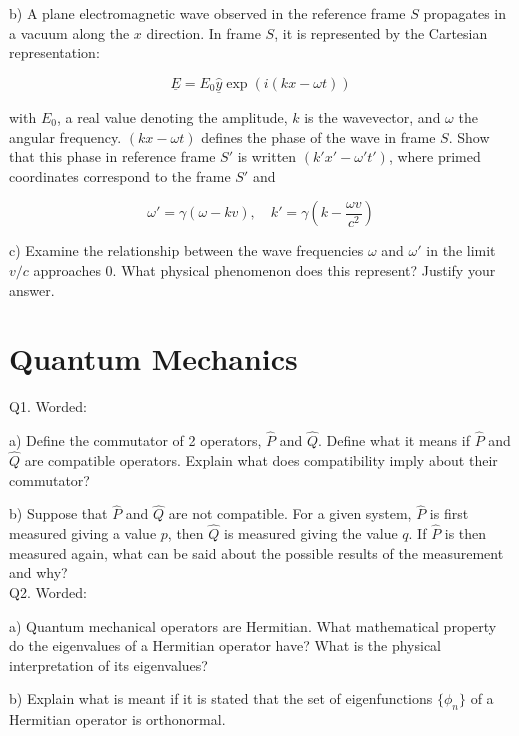 \documentclass[a4paper,11pt]{article}
\begin{document}
\medskip

b) A plane electromagnetic wave observed in the reference frame \( S \) propagates in a vacuum along the \( x \) direction. In frame \( S \), it is represented by the Cartesian representation: 

\[ \underline{E} = E_{0} \hat{\underline{y}} \exp(i(kx - \omega t)) \]

with \( E_{0} \), a real value denoting the amplitude, \( k \) is the wavevector, and \( \omega \) the angular frequency. \( (kx - \omega t) \) defines the phase of the wave in frame \( S \). Show that this phase in reference frame \( S' \) is written \( (k'x' - \omega' t') \), where primed coordinates correspond to the frame \( S' \) and

\[ \omega' = \gamma(\omega - kv), \quad k' = \gamma(k - \frac{\omega v}{c^{2}}) \]

\medskip

c) Examine the relationship between the wave frequencies \( \omega \) and \( \omega' \) in the limit \( v/c \) approaches \( 0 \). What physical phenomenon does this represent? Justify your answer.

\newpage

\section{Quantum Mechanics}

Q1. Worded:

a) Define the commutator of 2 operators, \( \hat{P} \) and \( \hat{Q} \). Define what it means if \( \hat{P} \) and \( \hat{Q} \) are compatible operators. Explain what does compatibility imply about their commutator?

\medskip

b) Suppose that \( \hat{P} \) and \( \hat{Q} \) are not compatible. For a given system, \( \hat{P} \) is first measured giving a value \( p \), then \( \hat{Q} \) is measured giving the value \( q \). If \( \hat{P} \) is then measured again, what can be said about the possible results of the measurement and why? \\

Q2. Worded:

a) Quantum mechanical operators are Hermitian. What mathematical property do the eigenvalues of a Hermitian operator have? What is the physical interpretation of its eigenvalues?

\medskip

b) Explain what is meant if it is stated that the set of eigenfunctions \( \{ \phi_{n} \} \) of a Hermitian operator is orthonormal. \\
\end{document}
